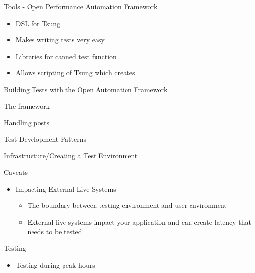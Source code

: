 \documentclass[xcolor=dvipsnames,14pt]{beamer}
\begin{document}
\begin{frame}{Tools - Open Performance Automation Framework}
  \begin{itemize}
    \item DSL for Tsung
    \item Makes writing tests very easy
    \item Libraries for canned test function
    \item Allows scripting of Tsung which creates
  \end{itemize}
\end{frame}

\begin{frame}{Building Tests with the Open Automation Framework}
  \item The framework
  \item Handling posts
\end{frame}

\begin{frame}{Test Development Patterns}
  \begin{itemize}
  \end{itemize}
\end{frame}

\begin{frame}{Infrastructure/Creating a Test Environment}
  \begin{itemize}
  \end{itemize}
\end{frame}

\begin{frame}{Caveats}
  \begin{itemize}
    \item Impacting External Live Systems
      \begin{itemize}
        \item The boundary between testing environment and user environment
        \item External live systems impact your application and can create latency that needs to be tested
      \end{itemize}
  \end{itemize}
\end{frame}

\begin{frame}{Testing}
  \begin{itemize}
    \item Testing during peak hours
  \end{itemize}
\end{frame}
\end{document}
